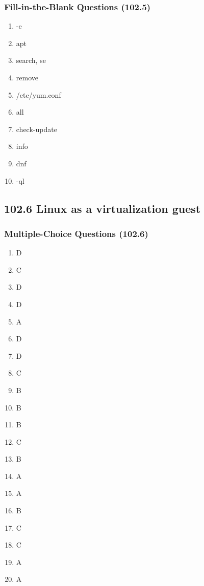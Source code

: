 \documentclass[a4paper]{report}
\begin{document}
\subsubsection*{Fill-in-the-Blank Questions (102.5)}
\begin{enumerate}[1.]
    \item -e
    \item apt
    \item search, se
    \item remove
    \item /etc/yum.conf
    \item all
    \item check-update
    \item info
    \item dnf
    \item -ql
\end{enumerate}


\subsection*{102.6 Linux as a virtualization guest}
\subsubsection*{Multiple-Choice Questions (102.6)}
\begin{enumerate}[1.]
    \item D
    \item C
    \item D
    \item D
    \item A
    \item D
    \item D
    \item C
    \item B
    \item B
    \item B
    \item C
    \item B
    \item A
    \item A
    \item B
    \item C
    \item C
    \item A
    \item A
\end{enumerate}
\end{document}

